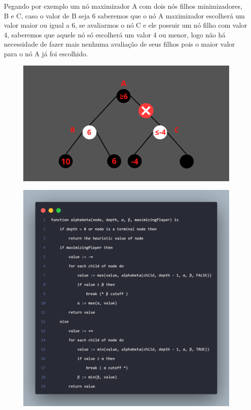 Pegando por exemplo um nó maximizador A com dois nós filhos minimizadores, B e C,
caso o valor de B seja 6 saberemos que o nó A maximizador escolherá um valor maior ou igual a 6,
se avaliarmos o nó C e ele possuir um nó filho com valor 4, saberemos que aquele nó só escolherá um valor 4
ou menor, logo não há necessidade de fazer mais nenhuma avaliação de seus filhos pois o maior valor para o nó
A já foi escolhido.
\begin{figure}[!htb]
    \centering
    \label{alpha-beta}
    \includegraphics[scale=0.30]{figuras/Inserir_um_pouquinho_de_texto_1.png}
\end{figure}

\begin{figure}[!htb]
    \centering
    \label{alphabeta-code}
    \includegraphics[scale=0.25]{figuras/alphabeta.png}
\end{figure}

